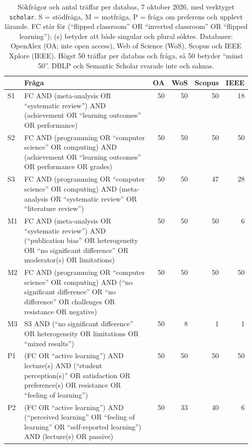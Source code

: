 \begin{table}[htbp]
  \centering\footnotesize
  \caption{Sökfrågor och antal träffar per databas, 7 oktober 2026, med
    verktyget \texttt{scholar}. S = stödfråga, M = motfråga, P = fråga om
    preferens och upplevt lärande. FC står för (\enquote{flipped
    classroom} OR \enquote{inverted classroom} OR \enquote{flipped
    learning}); (s) betyder att både singular och plural söktes.
    Databaser: OpenAlex (OA; inte \foreignlanguage{english}{open access}),
    Web of Science (WoS), Scopus och IEEE Xplore (IEEE). Högst 50 träffar
    per databas och fråga, så 50 betyder \enquote{minst 50}. DBLP och
    Semantic Scholar svarade inte och saknas.}
  \label{tab:flippat-fragor}
  \begin{tabular}{@{}l>{\raggedright\arraybackslash}p{0.57\linewidth}rrrr@{}}
    \toprule
    & Fråga & OA & WoS & Scopus & IEEE \\
    \midrule
    S1 & FC AND (meta-analysis OR \enquote{systematic review}) AND
      (achievement OR \enquote{learning outcomes} OR performance)
      & 50 & 50 & 50 & 18 \\
    S2 & FC AND (programming OR \enquote{computer science} OR computing)
      AND (achievement OR \enquote{learning outcomes} OR performance OR
      grades) & 50 & 50 & 50 & 50 \\
    S3 & FC AND (programming OR \enquote{computer science} OR computing)
      AND (meta-analysis OR \enquote{systematic review} OR
      \enquote{literature review}) & 50 & 50 & 47 & 28 \\
    M1 & FC AND (meta-analysis OR \enquote{systematic review}) AND
      (\enquote{publication bias} OR heterogeneity OR \enquote{no
      significant difference} OR moderator(s) OR limitations)
      & 50 & 50 & 50 & 6 \\
    M2 & FC AND (programming OR \enquote{computer science} OR computing)
      AND (\enquote{no significant difference} OR \enquote{no difference}
      OR challenges OR resistance OR negative) & 50 & 50 & 50 & 50 \\
    M3 & S3 AND (\enquote{no significant difference} OR heterogeneity OR
      limitations OR \enquote{mixed results}) & 50 & 8 & 1 & 1 \\
    P1 & (FC OR \enquote{active learning}) AND lecture(s) AND
      (\enquote{student perception(s)} OR satisfaction OR preference(s) OR
      resistance OR \enquote{feeling of learning}) & 50 & 50 & 50 & 50 \\
    P2 & (FC OR \enquote{active learning}) AND (\enquote{perceived
      learning} OR \enquote{feeling of learning} OR \enquote{self-reported
      learning}) AND (lecture(s) OR passive) & 50 & 33 & 40 & 6 \\
    \bottomrule
  \end{tabular}
\end{table}

